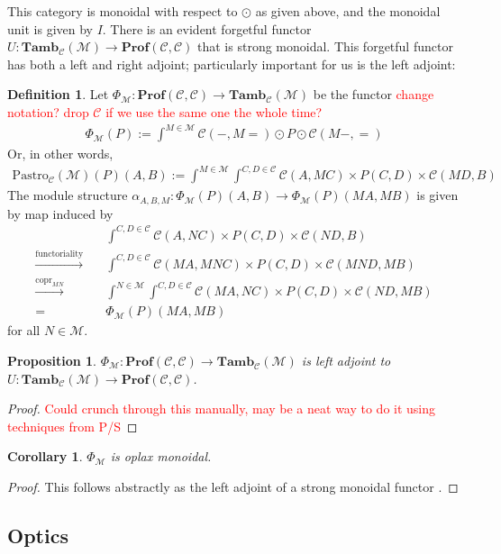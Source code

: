\documentclass[11pt,a4paper]{article}
\theoremstyle{plain}
\newtheorem{proposition}[theorem]{Proposition}
\newtheorem{corollary}[theorem]{Corollary}
\theoremstyle{definition}
\newtheorem{definition}[theorem]{Definition}
\newcommand{\C}{\mathscr{C}}
\newcommand{\M}{\mathscr{M}}
\newcommand{\Pastro}{\Phi}
\newcommand{\Prof}{\mathbf{Prof}}
\newcommand{\Tamb}{\mathbf{Tamb}}
\DeclareMathOperator{\copr}{copr}
\newcommand{\todo}[1]{\textcolor{red}{\small #1}}
\begin{document}
This category is monoidal with respect to $\odot$ as given above, and the monoidal unit is given by $I$. There is an evident forgetful functor $U : \Tamb_\C(\M) \to \Prof(\C, \C)$ that is strong monoidal. This forgetful functor has both a left and right adjoint; particularly important for us is the left adjoint:

\begin{definition}
Let $\Pastro_\M : \Prof(\C, \C) \to \Tamb_\C(\M)$ be the functor \todo{change notation? drop $\C$ if we use the same one the whole time?}
\begin{align*}
\Pastro_\M(P) := \int^{M \in \M}  \C(-, M{=}) \odot P \odot \C(M-, {=}) 
\end{align*}
Or, in other words, 
\begin{align*}
\mathrm{Pastro}_\C(\M)(P)(A,B) := \int^{M \in \M} \int^{C,D \in \C} \C(A, MC) \times P(C,D) \times  \C(MD, B)
\end{align*}
The module structure $\alpha_{A,B,M} : \Pastro_\M(P)(A,B) \to \Pastro_\M(P)(MA, MB)
$ is given by map induced by 
\begin{align*}
&\int^{C,D \in \C} \C(A, NC) \times P(C,D) \times  \C(ND, B) \\
\xrightarrow{\text{functoriality}} \quad& \int^{C,D \in \C} \C(MA, MNC) \times P(C,D) \times  \C(MND, MB) \\
\xrightarrow{\copr_{MN}} \quad&\int^{N \in \M} \int^{C,D \in \C} \C(MA, NC) \times P(C,D) \times  \C(ND, MB) \\
= \quad&\Pastro_\M(P)(MA, MB)
\end{align*}
for all $N \in \M$.
\end{definition}

\begin{proposition}
$\Pastro_\M : \Prof(\C, \C) \to \Tamb_\C(\M)$ is left adjoint to $U : \Tamb_\C(\M) \to \Prof(\C, \C)$.
\end{proposition}
\begin{proof}
\todo{Could crunch through this manually, may be a neat way to do it using techniques from P/S}
\end{proof}

\begin{corollary}
$\Pastro_\M$ is oplax monoidal.
\end{corollary}
\begin{proof}
This follows abstractly as the left adjoint of a strong monoidal functor \cite{Kelly1974}.
\end{proof}

\subsection{Optics}
\end{document}
